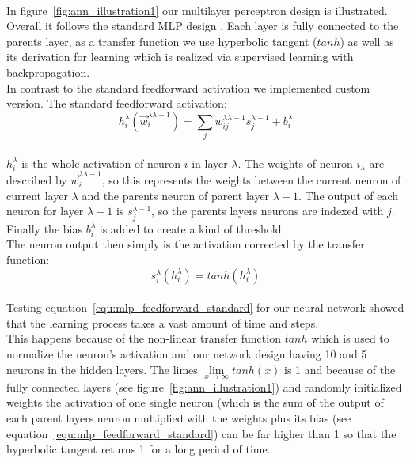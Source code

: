 \documentclass[lnicst,a4paper]{svmultln}
\begin{document}
\\
In figure~\ref{fig:ann_illustration1} our multilayer perceptron design is illustrated. Overall it follows the standard MLP design \cite{mlp}. Each layer is fully connected to the parents layer, as a transfer function we use hyperbolic tangent ($tanh$) as well as its derivation for learning which is realized via supervised learning with backpropagation.
\\
In contrast to the standard feedforward activation we implemented custom version. The standard feedforward activation:
\\
\begin{equation}
\label{equ:mlp_feedforward_standard}
h_{i}^{\lambda} (\vec{w}_{i}^{\lambda \lambda-1})
=
\sum\limits_{j} w_{ij}^{\lambda \lambda-1} s_{j}^{\lambda-1} + b_{i}^{\lambda}
\end{equation}
\\
$h_{i}^{\lambda}$ is the whole activation of neuron $i$ in layer $\lambda$. The weights of neuron $i_{\lambda}$ are described by $\vec{w}_{i}^{\lambda \lambda-1}$, so this represents the weights between the current neuron of current layer $\lambda$ and the parents neuron of parent layer $\lambda-1$. The output of each neuron for layer $\lambda-1$ is $s_{j}^{\lambda-1}$, so the parents layers neurons are indexed with $j$. Finally the bias $b_{i}^{\lambda}$ is added to create a kind of threshold.
\\
The neuron output then simply is the activation corrected by the transfer function:
\\
\begin{equation}
\label{equ:mlp_neuron_output}
s_{i}^{\lambda} (h_{i}^{\lambda}) = tanh(h_{i}^{\lambda})
\end{equation}
\\
Testing equation~\ref{equ:mlp_feedforward_standard} for our neural network showed that the learning process takes a vast amount of time and steps.
\\
This happens because of the non-linear transfer function $tanh$ which is used to normalize the neuron's activation and our network design having 10 and 5 neurons in the hidden layers. The limes $\lim\limits_{x \to \infty} tanh(x)$ is 1 and because of the fully connected layers (see figure~\ref{fig:ann_illustration1}) and randomly initialized weights the activation of one single neuron (which is the sum of the output of each parent layers neuron multiplied with the weights plus its bias (see equation~\ref{equ:mlp_feedforward_standard}) can be far higher than 1 so that the hyperbolic tangent returns 1 for a long period of time.
\end{document}
